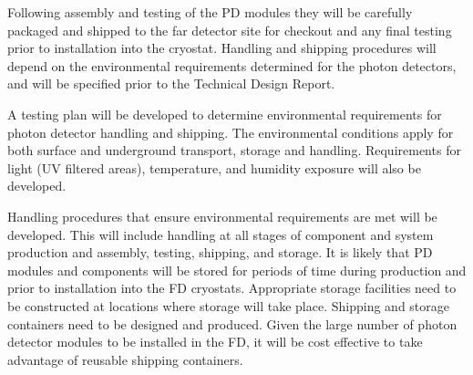 






Following assembly and testing of the PD modules they will be carefully packaged and shipped to the far detector site for checkout and any final testing prior to installation into the cryostat. Handling and shipping procedures will depend on the environmental requirements determined for the photon detectors, and will be specified prior to the Technical Design Report.

A testing plan will be developed to determine environmental requirements for photon detector handling and shipping. The environmental conditions apply for both surface and underground transport, storage and handling. Requirements for light (UV filtered areas), temperature, and humidity exposure will also be developed.

Handling procedures that ensure environmental requirements are met will be developed. This will include handling at all stages of component and system production and assembly, testing, shipping, and storage. It is likely that PD modules and components will be stored for periods of time during production and prior to installation into the FD cryostats. Appropriate storage facilities need to be constructed at locations where storage will take place. Shipping and storage containers need to be designed and produced. Given the large number of photon detector modules to be installed in the FD, it will be cost effective to take advantage of reusable shipping containers.

